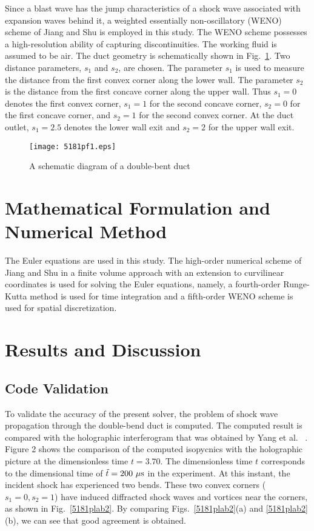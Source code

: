 \documentclass[runningheads]{svmult}
\begin{document}
Since a blast wave has the jump characteristics of a shock wave associated with expansion waves behind it, a weighted essentially non-oscillatory (WENO) scheme of Jiang and Shu \cite{5181pref1} is employed in this study. The WENO scheme possesses a high-resolution ability of capturing discontinuities. The working fluid is assumed to be air. The duct geometry is schematically shown in Fig.~\ref{5181plab1}. Two distance parameters, \(s_1\) and \(s_2\), are chosen. The parameter \(s_1\) is used to measure the distance from the first convex corner along the lower wall. The parameter \(s_2\)  is the distance from the first concave corner along the upper wall. Thus \(s_1=0\) denotes the first convex corner, \(s_1=1\) for the second concave corner, \(s_2=0\) for the first concave corner, and \(s_2=1\) for the second convex corner. At the duct outlet, \(s_1=2.5\) denotes the lower wall exit and \(s_2=2\) for the upper wall exit.
%
\begin{figure}
\begin{center}
\texttt{[image: 5181pf1.eps]}
\end{center}
\caption{A schematic diagram of a double-bent duct}
\label{5181plab1}
\end{figure}

\section{Mathematical Formulation and Numerical Method}

   The Euler equations are used in this study. The high-order numerical scheme of Jiang and Shu \cite{5181pref1} in a finite volume approach with an extension to curvilinear coordinates is used for solving the Euler equations, namely, a fourth-order Runge-Kutta method is used for time integration and a fifth-order WENO scheme is used for spatial discretization. 

\section{Results and Discussion}

\subsection{Code Validation}

To validate the accuracy of the present solver, the problem of shock wave propagation through the double-bend duct is computed. The computed result is compared with the holographic interferogram that was obtained by Yang et al.~\cite{5181pref2} . Figure 2 shows the comparison of the computed isopycnics with the holographic picture at the dimensionless time \(t=3.70\). The dimensionless time $t$ corresponds to the dimensional time of \(\tilde{t}=200\ \mu\rm s\) in the experiment. At this instant, the incident shock has experienced two bends. These two convex corners (\(s_1=0 , s_2=1\)) have induced diffracted shock waves and vortices near the corners, as shown in Fig.~\ref{5181plab2}. By comparing Figs.~\ref{5181plab2}(a) and \ref{5181plab2}(b), we can see that good agreement is obtained.
\end{document}
